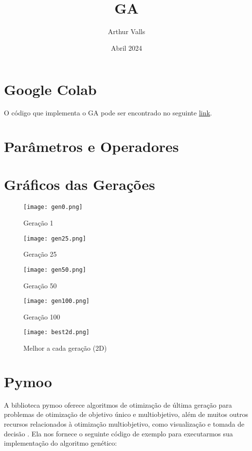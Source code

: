\documentclass{article}
\title{GA}
\author{Arthur Valls}
\date{Abril 2024}
\begin{document}
\maketitle

\section{Google Colab}

O código que implementa o GA pode ser encontrado no seguinte  \href{https://colab.research.google.com/drive/1zW4y2xiscGNOEI52n1qlYTZhmqqjBwG9?authuser=1}{link}.

\section{Parâmetros e Operadores}

\section{Gráficos das Gerações}

\begin{figure}[htbp]
  \centering
  \texttt{[image: gen0.png]}
  \caption{Geração 1}
\end{figure}

\begin{figure}[htbp]
  \centering
  \texttt{[image: gen25.png]}
  \caption{Geração 25}
\end{figure}

\begin{figure}[htbp]
  \centering
  \texttt{[image: gen50.png]}
  \caption{Geração 50}
\end{figure}

\begin{figure}[htbp]
  \centering
  \texttt{[image: gen100.png]}
  \caption{Geração 100}
\end{figure}

\begin{figure}[htbp]
  \centering
  \texttt{[image: best2d.png]}
  \caption{Melhor a cada geração (2D)}
\end{figure}
\newpage
\section{Pymoo}

A biblioteca pymoo oferece algoritmos de otimização de última geração para problemas de otimização de objetivo único e multiobjetivo, além de muitos outros recursos relacionados à otimização multiobjetivo, como visualização e tomada de decisão \cite{pymoo}. Ela nos fornece o seguinte código de exemplo para executarmos sua implementação do algoritmo genético:
\end{document}
